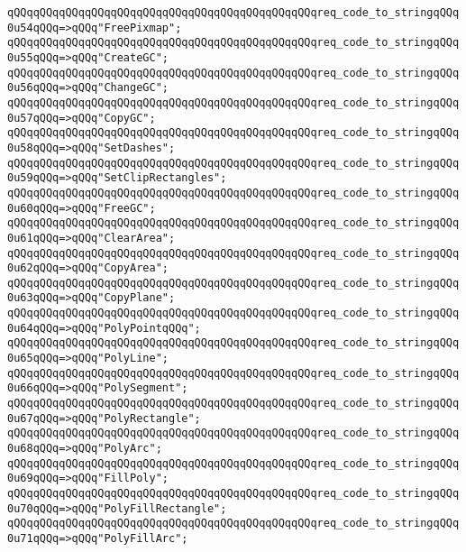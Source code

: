 \verb|qQQqqQQqqQQqqQQqqQQqqQQqqQQqqQQqqQQqqQQqqQQqqQQqreq_code_to_stringqQQq0u54qQQq=>qQQq"FreePixmap";|\newline
\verb|qQQqqQQqqQQqqQQqqQQqqQQqqQQqqQQqqQQqqQQqqQQqqQQqreq_code_to_stringqQQq0u55qQQq=>qQQq"CreateGC";|\newline
\verb|qQQqqQQqqQQqqQQqqQQqqQQqqQQqqQQqqQQqqQQqqQQqqQQqreq_code_to_stringqQQq0u56qQQq=>qQQq"ChangeGC";|\newline
\verb|qQQqqQQqqQQqqQQqqQQqqQQqqQQqqQQqqQQqqQQqqQQqqQQqreq_code_to_stringqQQq0u57qQQq=>qQQq"CopyGC";|\newline
\verb|qQQqqQQqqQQqqQQqqQQqqQQqqQQqqQQqqQQqqQQqqQQqqQQqreq_code_to_stringqQQq0u58qQQq=>qQQq"SetDashes";|\newline
\verb|qQQqqQQqqQQqqQQqqQQqqQQqqQQqqQQqqQQqqQQqqQQqqQQqreq_code_to_stringqQQq0u59qQQq=>qQQq"SetClipRectangles";|\newline
\verb|qQQqqQQqqQQqqQQqqQQqqQQqqQQqqQQqqQQqqQQqqQQqqQQqreq_code_to_stringqQQq0u60qQQq=>qQQq"FreeGC";|\newline
\verb|qQQqqQQqqQQqqQQqqQQqqQQqqQQqqQQqqQQqqQQqqQQqqQQqreq_code_to_stringqQQq0u61qQQq=>qQQq"ClearArea";|\newline
\verb|qQQqqQQqqQQqqQQqqQQqqQQqqQQqqQQqqQQqqQQqqQQqqQQqreq_code_to_stringqQQq0u62qQQq=>qQQq"CopyArea";|\newline
\verb|qQQqqQQqqQQqqQQqqQQqqQQqqQQqqQQqqQQqqQQqqQQqqQQqreq_code_to_stringqQQq0u63qQQq=>qQQq"CopyPlane";|\newline
\verb|qQQqqQQqqQQqqQQqqQQqqQQqqQQqqQQqqQQqqQQqqQQqqQQqreq_code_to_stringqQQq0u64qQQq=>qQQq"PolyPointqQQq";|\newline
\verb|qQQqqQQqqQQqqQQqqQQqqQQqqQQqqQQqqQQqqQQqqQQqqQQqreq_code_to_stringqQQq0u65qQQq=>qQQq"PolyLine";|\newline
\verb|qQQqqQQqqQQqqQQqqQQqqQQqqQQqqQQqqQQqqQQqqQQqqQQqreq_code_to_stringqQQq0u66qQQq=>qQQq"PolySegment";|\newline
\verb|qQQqqQQqqQQqqQQqqQQqqQQqqQQqqQQqqQQqqQQqqQQqqQQqreq_code_to_stringqQQq0u67qQQq=>qQQq"PolyRectangle";|\newline
\verb|qQQqqQQqqQQqqQQqqQQqqQQqqQQqqQQqqQQqqQQqqQQqqQQqreq_code_to_stringqQQq0u68qQQq=>qQQq"PolyArc";|\newline
\verb|qQQqqQQqqQQqqQQqqQQqqQQqqQQqqQQqqQQqqQQqqQQqqQQqreq_code_to_stringqQQq0u69qQQq=>qQQq"FillPoly";|\newline
\verb|qQQqqQQqqQQqqQQqqQQqqQQqqQQqqQQqqQQqqQQqqQQqqQQqreq_code_to_stringqQQq0u70qQQq=>qQQq"PolyFillRectangle";|\newline
\verb|qQQqqQQqqQQqqQQqqQQqqQQqqQQqqQQqqQQqqQQqqQQqqQQqreq_code_to_stringqQQq0u71qQQq=>qQQq"PolyFillArc";|\newline

